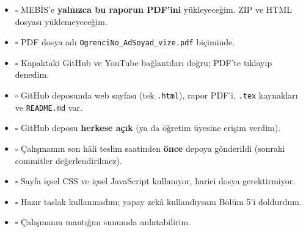 \documentclass[12pt,a4paper]{article}
\begin{document}
\begin{itemize}
  \item $\square$ MEBİS'e \textbf{yalnızca bu raporun PDF'ini} yükleyeceğim. ZIP ve HTML dosyası yüklemeyeceğim.
  \item $\square$ PDF dosya adı \texttt{OgrenciNo\_AdSoyad\_vize.pdf} biçiminde.
  \item $\square$ Kapaktaki GitHub ve YouTube bağlantıları doğru; PDF'te tıklayıp denedim.
  \item $\square$ GitHub deposunda web sayfası (tek \texttt{.html}), rapor PDF'i, \texttt{.tex} kaynakları ve \texttt{README.md} var.
  \item $\square$ GitHub deposu \textbf{herkese açık} (ya da öğretim üyesine erişim verdim).
  \item $\square$ Çalışmamın son hâli teslim saatinden \textbf{önce} depoya gönderildi (sonraki commitler değerlendirilmez).
  \item $\square$ Sayfa içsel CSS ve içsel JavaScript kullanıyor, harici dosya gerektirmiyor.
  \item $\square$ Hazır taslak kullanmadım; yapay zekâ kullandıysam Bölüm 5'i doldurdum.
  \item $\square$ Çalışmanın mantığını sunumda anlatabilirim.
\end{itemize}
\end{document}
